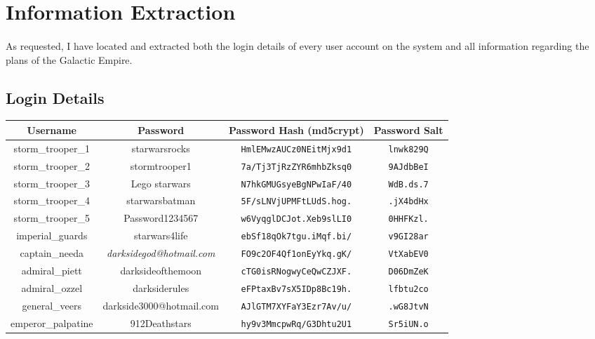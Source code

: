 \documentclass{article}
\begin{document}
\newpage

\section{Information Extraction}
\paragraph{}
As requested, I have located and extracted both the login details of every user account on the system and all information regarding the plans of the Galactic Empire.

\subsection{Login Details}

\begin{adjustwidth}{-1.5cm}{}
\begin{tabular}{ |c|c|c|c| }
\hline
\textbf{Username} & \textbf{Password} & \textbf{Password Hash (md5crypt)} & \textbf{Password Salt} \\
\hline
storm\_trooper\_1 & starwarsrocks & \texttt{HmlEMwzAUCz0NEitMjx9d1} & \texttt{lnwk829Q} \\
\hline
storm\_trooper\_2 & stormtrooper1 & \texttt{7a/Tj3TjRzZYR6mhbZksq0} & \texttt{9AJdbBeI} \\
\hline
storm\_trooper\_3 & Lego starwars & \texttt{N7hkGMUGsyeBgNPwIaF/40} & \texttt{WdB.ds.7} \\
\hline
storm\_trooper\_4 & starwarsbatman & \texttt{5F/sLNVjUPMFtLUdS.hog.} & \texttt{.jX4bdHx} \\
\hline
storm\_trooper\_5 & Password1234567 & \texttt{w6VyqglDCJot.Xeb9slLI0} & \texttt{0HHFKzl.} \\
\hline
imperial\_guards & starwars4life & \texttt{ebSf18qOk7tgu.iMqf.bi/} & \texttt{v9GI28ar} \\
\hline
captain\_needa & \emph{darksidegod@hotmail.com} & \texttt{FO9c2OF4Qf1onEyYkq.gK/} & \texttt{VtXabEV0} \\
\hline
admiral\_piett & darksideofthemoon & \texttt{cTG0isRNogwyCeQwCZJXF.} & \texttt{D06DmZeK} \\
\hline
admiral\_ozzel & darksiderules & \texttt{eFPtaxBv7sX5IDp8Bc19h.} & \texttt{lfbtu2co} \\
\hline
general\_veers & darkside3000@hotmail.com & \texttt{AJlGTM7XYFaY3Ezr7Av/u/} & \texttt{.wG8JtvN} \\
\hline
emperor\_palpatine & 912Deathstars & \texttt{hy9v3MmcpwRq/G3Dhtu2U1} & \texttt{Sr5iUN.o} \\

\end{tabular}
\end{adjustwidth}
\end{document}
